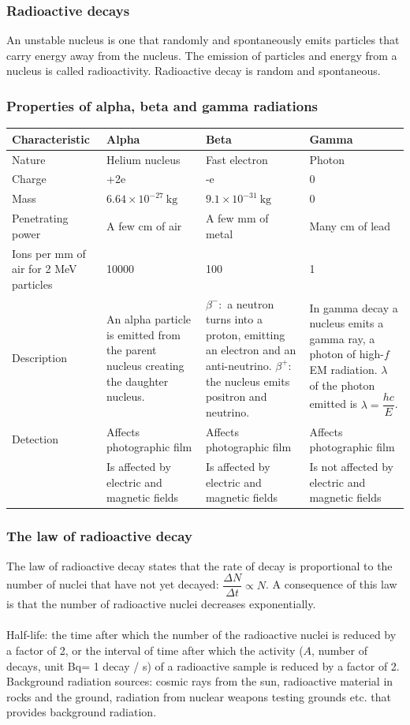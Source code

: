 \subsubsection*{Radioactive decays}
An unstable nucleus is one that randomly and spontaneously emits particles that carry energy away from the nucleus.
The emission of particles and energy from a nucleus is called radioactivity. Radioactive decay is random and spontaneous.
\subsubsection*{Properties of alpha, beta and gamma radiations}
\begin{center}
\begin{tabularx}{\textwidth}{@{}|Y |Y |Y| Y|@{}}
\toprule
\textbf{Characteristic} & \textbf{Alpha} & \textbf{Beta} & \textbf{Gamma} \\
\midrule
Nature & Helium nucleus & Fast electron & Photon\\
\midrule
Charge & +2e & -e & 0\\
\midrule
Mass & $6.64\times 10^{-27}\ \text{kg}$ & $9.1\times 10^{-31}\ \text{kg}$ & 0\\
\midrule
Penetrating power & A few cm of air & A few mm of metal & Many cm of lead \\\midrule
Ions per mm of air for 2 MeV particles & 10000 & 100 & 1\\\midrule
Description & An alpha particle is emitted from the parent nucleus creating the daughter nucleus. 
& $\beta^-:$ a neutron turns into a proton, emitting an electron and an anti-neutrino. $\beta^+$: the nucleus emits positron and neutrino. 
& In gamma decay a nucleus emits a gamma ray, a photon of high-$f$ EM radiation. $\lambda$ of the photon emitted is $\lambda=\dfrac{hc}{E}$.\\\midrule
Detection & Affects photographic film & Affects photographic film & Affects photographic film\\
 & Is affected by electric and magnetic fields & Is affected by electric and magnetic fields &Is not affected by electric and magnetic fields\\
\bottomrule
\end{tabularx}
\end{center}
\subsubsection*{The law of radioactive decay}
The law of radioactive decay states that the rate of decay is proportional to the number of nuclei that have not yet decayed: $\dfrac{\Delta N}{\Delta t}\propto N$.
A consequence of this law is that the number of radioactive nuclei decreases exponentially.\\\\
Half-life: the time after which the number of the radioactive nuclei is reduced by a factor of 2, or the interval of time after which the activity ($A$, number of decays, unit Bq= 1 decay / s) of a radioactive sample is reduced by a factor of 2.\\
Background radiation sources: cosmic rays from the sun, radioactive material in rocks and the ground, radiation from nuclear weapons testing grounds etc. that provides background radiation.
